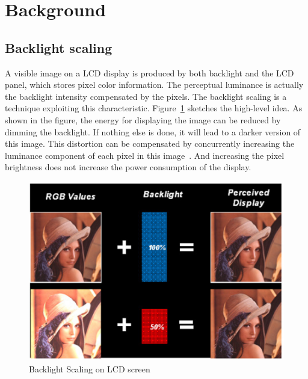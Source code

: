\section{Background}
\label{sec:background}
\subsection{Backlight scaling}
A visible image on a LCD display is produced by both backlight and the
LCD panel, which stores pixel color information. The perceptual
luminance is actually the backlight intensity compensated by the
pixels. The backlight scaling is a technique  exploiting this
characteristic.  Figure~\ref{fig:backlightscaling} sketches the
high-level idea. As shown in the figure, the energy for displaying the
image can be reduced by dimming the backlight. If nothing else is
done, it will lead to a darker version of this image. This distortion
can be compensated by concurrently increasing the luminance component
of each pixel in this image~\cite{PMLDV03, CHP07, CCS06, CSC02}. And
increasing the pixel brightness does not increase the power
consumption of the display.


\begin{figure}[!htb]
  \centering
  \includegraphics[width=.45\textwidth]{./figures/backlightscaling.eps}
  \caption{Backlight Scaling on LCD screen}
  \label{fig:backlightscaling}
\end{figure}

